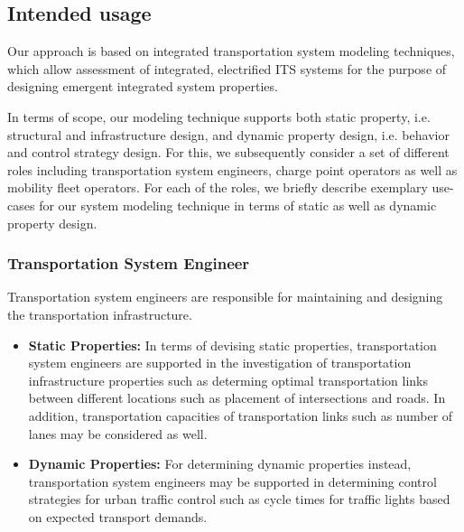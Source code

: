 \documentclass[a4paper,twoside]{article}
\begin{document}
	\subsection{Intended usage}
	\label{sec:scope}
	
	Our approach is based on integrated transportation system modeling techniques, which allow assessment of integrated, electrified ITS systems for the purpose of designing emergent integrated system properties.
	
	In terms of scope, our modeling technique supports both static property, i.e. structural and infrastructure design, and dynamic property design, i.e. behavior and control strategy design. For this, we subsequently consider a set of different roles including transportation system engineers, charge point operators as well as mobility fleet operators. For each of the roles, we briefly describe exemplary use-cases for our system modeling technique in terms of static as well as dynamic property design.

\subsubsection{Transportation System Engineer}
Transportation system engineers are responsible for maintaining and designing the transportation infrastructure.


\begin{itemize}
	\item \textbf{Static Properties:} In terms of devising static properties, transportation system engineers are supported in the investigation of transportation infrastructure properties such as determing optimal transportation links between different locations such as placement of intersections and roads. In addition, transportation capacities of transportation links such as number of lanes may be considered as well.
	\item \textbf{Dynamic Properties:} For determining dynamic properties instead, transportation system engineers may be supported in determining control strategies for urban traffic control such as cycle times for traffic lights based on expected transport demands. 
\end{itemize}
	
\end{document}
